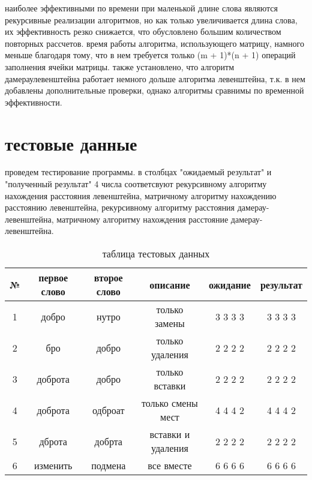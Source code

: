 \par
наиболее эффективными по времени при маленькой длине слова являются рекурсивные реализации алгоритмов, но как только увеличивается длина слова, их эффективность резко снижается, что обусловлено большим количеством повторных рассчетов. время работы алгоритма, использующего матрицу, намного меньше благодаря тому, что в нем требуется только (m + 1)*(n + 1) операций заполнения ячейки матрицы. также установлено, что алгоритм дамераулевенштейна работает немного дольше алгоритма левенштейна, т.к. в нем добавлены дополнительные проверки, однако алгоритмы сравнимы по временной эффективности.

\section{тестовые данные}

\par
проведем тестирование программы. в столбцах "ожидаемый результат" и "полученный результат" 4 числа соответсвуют рекурсивному алгоритму нахождения расстояния левенштейна, матричному алгоритму нахождению расстоянию левенштейна, рекурсивному алгоритму расстояния дамерау-левенштейна, матричному алгоритму нахождения расстояние дамерау-левенштейна.

\begin{table} [h!]
\caption{таблица тестовых данных}
	\begin{tabular}{|c c c c c c|} 
 	\hline
    № & первое слово & второе слово & описание & ожидание & результат \\ [0.7ex] 
 	\hline\hline
    1 & добро & нутро & только замены & 3 3 3 3 & 3 3 3 3\\
 	\hline
    2 & бро & добро & только удаления & 2 2 2 2 & 2 2 2 2\\
 	\hline
    3 & доброта & добро & только вставки & 2 2 2 2 & 2 2 2 2\\
	\hline
    4 & доброта & одброат & только смены мест & 4 4 4 2 & 4 4 4 2\\
	\hline
    5 & дброта & добрта & вставки и удаления & 2 2 2 2 & 2 2 2 2\\
	\hline
    6 & изменить & подмена & все вместе & 6 6 6 6 & 6 6 6 6\\
	\hline
	\end{tabular}
\end{table}



